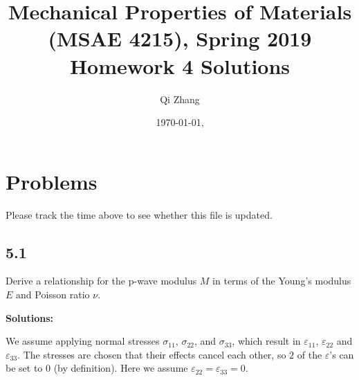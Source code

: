 \documentclass[12pt]{article}
\begin{document}

\title{Mechanical Properties of Materials (MSAE 4215), Spring 2019\\ Homework 4 Solutions}
\author{Qi Zhang}
\date{\today, \currenttime}

\maketitle

\tableofcontents

\section{Problems}
Please track the time above to see whether this file is updated.

\subsection{5.1}
Derive a relationship for the p-wave modulus $M$ in terms of the Young's modulus $E$ and Poisson ratio $\nu$.

\textbf{Solutions:}

We assume applying normal stresses $\sigma_{11}$, $\sigma_{22}$, and $\sigma_{33}$, which result in $\varepsilon_{11}$,
$\varepsilon_{22}$ and $\varepsilon_{33}$.
The stresses are chosen that their effects cancel each other, so
$2$ of the $\varepsilon$'s can be set to $0$ (by definition). Here we assume $\varepsilon_{22} = \varepsilon_{33} = 0$.
\end{document}
